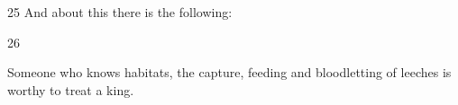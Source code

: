 \begin{translation}

\item[25]
And about this there is the following:
\begin{sloka}
\end{sloka}

\item[26]

\begin{sloka}
    Someone who knows habitats, the capture, feeding and bloodletting of
leeches is worthy to treat a king.
\end{sloka}

\end{translation}



